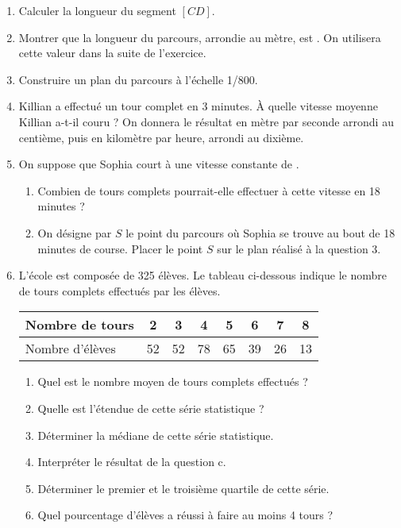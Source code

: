    \begin{enumerate}
      \setlength{\itemsep}{-1mm}
      \item Calculer la longueur du segment $[CD]$.
      \item Montrer que la longueur du parcours, arrondie au mètre, est . \newline
         On utilisera cette valeur dans la suite de l’exercice.
      \item Construire un plan du parcours à l’échelle 1/800. 
      \item Killian a effectué un tour complet en 3 minutes. \newline
         À quelle vitesse moyenne Killian a-t-il couru ? On donnera le résultat en mètre par seconde arrondi au centième, puis en kilomètre par heure, arrondi au dixième. 
      \item On suppose que Sophia court à une vitesse constante de .
         \begin{enumerate}
            \setlength{\itemsep}{-1mm}
            \item Combien de tours complets pourrait-elle effectuer à cette vitesse en 18 minutes ?
            \item On désigne par $S$ le point du parcours où Sophia se trouve au bout de 18 minutes de course. \newline
               Placer le point $S$ sur le plan réalisé à la question 3.
         \end{enumerate}
      \item L’école est composée de 325 élèves. Le tableau ci-dessous indique le nombre de tours complets effectués par les élèves.
         \begin{center}
            \begin{tabular}{|p{3cm}|*{7}{C{1}|}}
               \hline
               Nombre de tours & 2 & 3 & 4 & 5 & 6 & 7 & 8 \\
               \hline
               Nombre d'élèves & 52 & 52 & 78 & 65 & 39 & 26 & 13 \\
               \hline
            \end{tabular}
         \end{center}
         \begin{enumerate}
            \setlength{\itemsep}{-1mm}
            \item Quel est le nombre moyen de tours complets effectués ?
            \item Quelle est l’étendue de cette série statistique ?
            \item Déterminer la médiane de cette série statistique.
            \item Interpréter le résultat de la question c.
            \item Déterminer le premier et le troisième quartile de cette série.
            \item Quel pourcentage d’élèves a réussi à faire au moins 4 tours ?
         \end{enumerate}
   \end{enumerate}